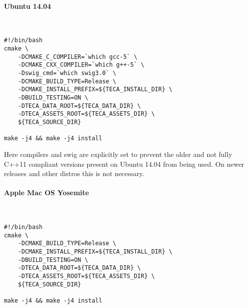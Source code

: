 \documentclass[a4paper,10pt,DIV=12]{scrreprt}
\begin{document}
\paragraph{Ubuntu 14.04} $\;$ \\ \\
\vspace{0mm}\hspace{0.2in}\begin{minipage}{0.8\textwidth}
\begin{verbatim}
#!/bin/bash
cmake \
    -DCMAKE_C_COMPILER=`which gcc-5` \
    -DCMAKE_CXX_COMPILER=`which g++-5` \
    -Dswig_cmd=`which swig3.0` \
    -DCMAKE_BUILD_TYPE=Release \
    -DCMAKE_INSTALL_PREFIX=${TECA_INSTALL_DIR} \
    -DBUILD_TESTING=ON \
    -DTECA_DATA_ROOT=${TECA_DATA_DIR} \
    -DTECA_ASSETS_ROOT=${TECA_ASSETS_DIR} \
    ${TECA_SOURCE_DIR}

make -j4 && make -j4 install
\end{verbatim}
\end{minipage}\vspace{2mm}

\noindent Here compilers and swig are explicitly set to prevent the older and not fully C++11
compliant versions present on Ubuntu 14.04 from being used. On newer releases and other distros
this is not necessary.

\paragraph{Apple Mac OS Yosemite} $\;$ \\ \\
\vspace{0mm}\hspace{0.2in}\begin{minipage}{0.8\textwidth}
\begin{verbatim}
#!/bin/bash
cmake \
    -DCMAKE_BUILD_TYPE=Release \
    -DCMAKE_INSTALL_PREFIX=${TECA_INSTALL_DIR} \
    -DBUILD_TESTING=ON \
    -DTECA_DATA_ROOT=${TECA_DATA_DIR} \
    -DTECA_ASSETS_ROOT=${TECA_ASSETS_DIR} \
    ${TECA_SOURCE_DIR}

make -j4 && make -j4 install
\end{verbatim}
\end{minipage}\vspace{2mm}
%
%
\end{document}
